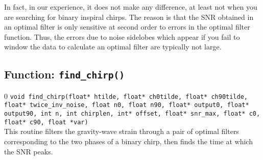 In fact, in our experience, it does not make any difference, at least
not when you are searching for binary inspiral chirps.  The reason is
that the SNR obtained in an optimal filter is only sensitive at second
order to errors in the optimal filter function.  Thus, the errors due
to noise sidelobes which appear if you fail to window the data to
calculate an optimal filter are typically not large.
\clearpage


\subsection{Function: {\tt find\_chirp()}}
\label{ss:find_chirp}
\setcounter{equation}0
{\tt void find\_chirp(float* htilde, float* ch0tilde, float* ch90tilde, float* twice\_inv\_noise, float n0, float n90, 
                float* output0, float* output90, int n, int chirplen, int*
                offset, float* snr\_max, float* c0, float* c90, float
                *var) }\\
This routine filters the gravity-wave strain through a pair of optimal
filters corresponding to the two phases of a binary chirp, then finds
the time at which the SNR peaks.

